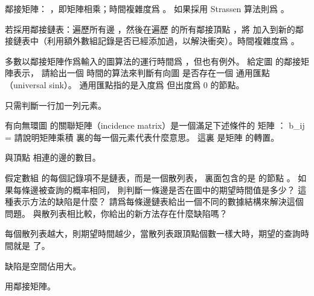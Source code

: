 \startANSWER
鄰接矩陣： ，即矩陣相乘；時間複雜度爲 。
如果採用 Strassen 算法則爲 。

若採用鄰接鏈表：遍歷所有邊 ，然後在遍歷  的所有鄰接頂點 ，將  加入到新的鄰接鏈表中（利用額外數組記錄是否已經添加過，以解決衝突）。時間複雜度爲 。
\stopANSWER

\startEXERCISE
多數以鄰接矩陣作爲輸入的圖算法的運行時間爲 ，但也有例外。
給定圖  的鄰接矩陣表示，
請給出一個  時間的算法來判斷有向圖  是否存在一個 {\EMP 通用匯點}（universal sink）。
通用匯點指的是入度爲  但出度爲 0 的節點。
\stopEXERCISE

\startANSWER
只需判斷一行加一列元素。
\stopANSWER

\startEXERCISE
有向無環圖  的{\EMP 關聯矩陣}（incidence matrix）是一個滿足下述條件的  矩陣 ：
\startformula
b_{ij} = \startcases
{} \MC {} \NR
{} \MC {} \NR
{} \MC {} \NR
\stopcases
\stopformula
請說明矩陣乘積  裏的每一個元素代表什麼意思。
這裏  是矩陣  的轉置。
\stopEXERCISE

\startANSWER
與頂點  相連的邊的數目。
\stopANSWER

\startEXERCISE
假定數組  的每個記錄項不是鏈表，而是一個散列表，
裏面包含的是  的節點 。
如果每條邊被查詢的概率相同，
則判斷一條邊是否在圖中的期望時間值是多少？
這種表示方法的缺陷是什麼？
請爲每條邊鏈表給出一個不同的數據結構來解決這個問題。
與散列表相比較，你給出的新方法存在什麼缺陷嗎？
\stopEXERCISE

\startANSWER
每個散列表越大，則期望時間越少，當散列表跟頂點個數一樣大時，期望的查詢時間就是  了。

缺陷是空間佔用大。

用鄰接矩陣。
\stopANSWER

\stopsection
